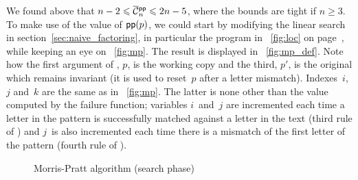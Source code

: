 \vspace*{-20pt}


We found above that \(n-2 \leqslant \OC{\fun{pp}}{n} \leqslant 2n -
5\), where the bounds are tight if \(n \geqslant 3\). To make use of
the value of \(\textsf{pp}(p)\), we could start by modifying the linear
search in section~\ref{sec:naive_factoring}, in particular the program
in \fig~\ref{fig:loc} on page~\pageref{fig:loc}, while keeping an eye
on \fig~\vref{fig:mp}. The result is displayed in
\fig~\vref{fig:mp_def}. Note how the first argument of
, \(p\), is the working copy and the
third, \(p'\), is the original which remains invariant (it is used to
reset~\(p\) after a letter mismatch). Indexes~\(i\), \(j\) and~\(k\)
are the same as in \fig~\vref{fig:mp}. The latter is none other than
the value computed by the failure function; variables \(i\)~and~\(j\)
are incremented each time a letter in the pattern is successfully
matched against a letter in the text (third rule of ) and
\(j\)~is also incremented each time there is a mismatch of the first
letter of the pattern (fourth rule of ).
\begin{figure}[h]
\centering
\abovedisplayskip=0pt
\belowdisplayskip=0pt
\caption{Morris-Pratt algorithm (search phase)\label{fig:mp_def}}
\end{figure}


